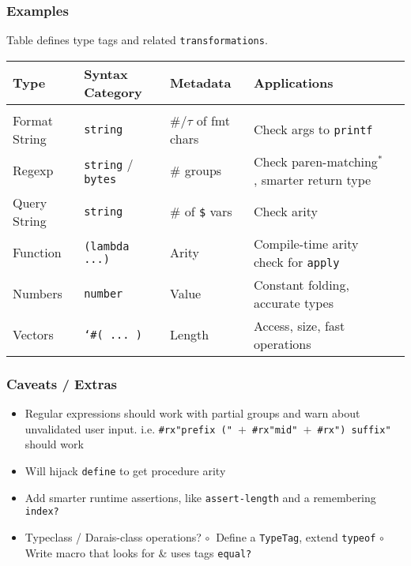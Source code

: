 \documentclass{article}
\begin{document}
\subsubsection*{Examples}

Table defines type tags and related \texttt{transformations}.

\vspace{0.4cm}
\begin{center}
\hspace{-3cm}\begin{tabular}{l l l l l}
  Type          &    Syntax Category          &    Metadata            &    Applications    \\\hline\hline
\\Format String &  {\tt string}               & \#/$\tau$ of fmt chars & Check args to {\tt printf}
\\Regexp        &  {\tt string} / {\tt bytes} & \# groups              & Check paren-matching${}^*$, smarter return type
\\Query String  &  {\tt string}               & \# of {\tt \$} vars    & Check arity
\\Function      &  {\tt (lambda ...)}         & Arity                  & Compile-time arity check for {\tt apply}
\\Numbers       &  {\tt number}               & Value                  & Constant folding, accurate types
\\Vectors       &  {\tt `\#( ... )}           & Length                 & Access, size, fast operations
\end{tabular}
\end{center}


\subsubsection*{Caveats / Extras}
\begin{itemize}
  \item Regular expressions should work with partial groups and warn about unvalidated user input.
  \subitem  i.e. \texttt{\#rx"prefix (" $+$ \#rx"mid" $+$ \#rx") suffix"} should work
  \item {Will hijack \texttt{define} to get procedure arity}
  \item {Add smarter runtime assertions, like \texttt{assert-length} and a remembering \texttt{index?}}
  \item Typeclass / Darais-class operations?
  \subitem $\circ~$ Define a {\tt TypeTag}, extend \texttt{typeof}
  \subitem $\circ~$ Write macro that looks for \& uses tags {\tt equal?}
\end{itemize}
\end{document}
